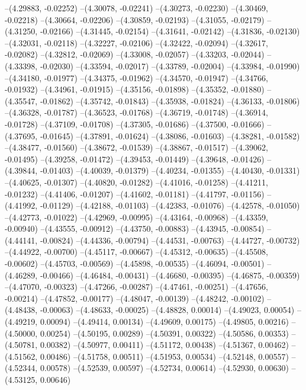 --(4.29883, -0.02252)
--(4.30078, -0.02241)
--(4.30273, -0.02230)
--(4.30469, -0.02218)
--(4.30664, -0.02206)
--(4.30859, -0.02193)
--(4.31055, -0.02179)
--(4.31250, -0.02166)
--(4.31445, -0.02154)
--(4.31641, -0.02142)
--(4.31836, -0.02130)
--(4.32031, -0.02118)
--(4.32227, -0.02106)
--(4.32422, -0.02094)
--(4.32617, -0.02082)
--(4.32812, -0.02069)
--(4.33008, -0.02057)
--(4.33203, -0.02044)
--(4.33398, -0.02030)
--(4.33594, -0.02017)
--(4.33789, -0.02004)
--(4.33984, -0.01990)
--(4.34180, -0.01977)
--(4.34375, -0.01962)
--(4.34570, -0.01947)
--(4.34766, -0.01932)
--(4.34961, -0.01915)
--(4.35156, -0.01898)
--(4.35352, -0.01880)
--(4.35547, -0.01862)
--(4.35742, -0.01843)
--(4.35938, -0.01824)
--(4.36133, -0.01806)
--(4.36328, -0.01787)
--(4.36523, -0.01768)
--(4.36719, -0.01748)
--(4.36914, -0.01728)
--(4.37109, -0.01708)
--(4.37305, -0.01686)
--(4.37500, -0.01666)
--(4.37695, -0.01645)
--(4.37891, -0.01624)
--(4.38086, -0.01603)
--(4.38281, -0.01582)
--(4.38477, -0.01560)
--(4.38672, -0.01539)
--(4.38867, -0.01517)
--(4.39062, -0.01495)
--(4.39258, -0.01472)
--(4.39453, -0.01449)
--(4.39648, -0.01426)
--(4.39844, -0.01403)
--(4.40039, -0.01379)
--(4.40234, -0.01355)
--(4.40430, -0.01331)
--(4.40625, -0.01307)
--(4.40820, -0.01282)
--(4.41016, -0.01258)
--(4.41211, -0.01232)
--(4.41406, -0.01207)
--(4.41602, -0.01181)
--(4.41797, -0.01156)
--(4.41992, -0.01129)
--(4.42188, -0.01103)
--(4.42383, -0.01076)
--(4.42578, -0.01050)
--(4.42773, -0.01022)
--(4.42969, -0.00995)
--(4.43164, -0.00968)
--(4.43359, -0.00940)
--(4.43555, -0.00912)
--(4.43750, -0.00883)
--(4.43945, -0.00854)
--(4.44141, -0.00824)
--(4.44336, -0.00794)
--(4.44531, -0.00763)
--(4.44727, -0.00732)
--(4.44922, -0.00700)
--(4.45117, -0.00667)
--(4.45312, -0.00635)
--(4.45508, -0.00602)
--(4.45703, -0.00569)
--(4.45898, -0.00535)
--(4.46094, -0.00501)
--(4.46289, -0.00466)
--(4.46484, -0.00431)
--(4.46680, -0.00395)
--(4.46875, -0.00359)
--(4.47070, -0.00323)
--(4.47266, -0.00287)
--(4.47461, -0.00251)
--(4.47656, -0.00214)
--(4.47852, -0.00177)
--(4.48047, -0.00139)
--(4.48242, -0.00102)
--(4.48438, -0.00063)
--(4.48633, -0.00025)
--(4.48828, 0.00014)
--(4.49023, 0.00054)
--(4.49219, 0.00094)
--(4.49414, 0.00134)
--(4.49609, 0.00175)
--(4.49805, 0.00216)
--(4.50000, 0.00254)
--(4.50195, 0.00289)
--(4.50391, 0.00322)
--(4.50586, 0.00353)
--(4.50781, 0.00382)
--(4.50977, 0.00411)
--(4.51172, 0.00438)
--(4.51367, 0.00462)
--(4.51562, 0.00486)
--(4.51758, 0.00511)
--(4.51953, 0.00534)
--(4.52148, 0.00557)
--(4.52344, 0.00578)
--(4.52539, 0.00597)
--(4.52734, 0.00614)
--(4.52930, 0.00630)
--(4.53125, 0.00646)
